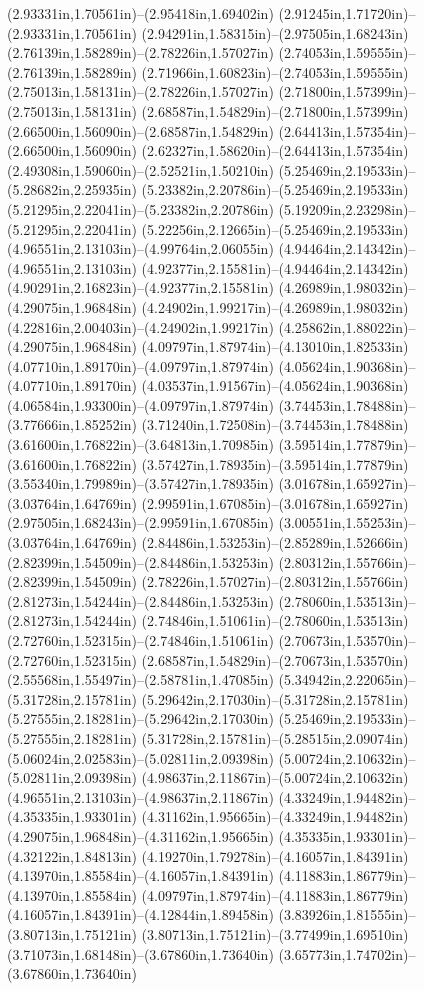 (2.93331in,1.70561in)--(2.95418in,1.69402in) (2.91245in,1.71720in)--(2.93331in,1.70561in) (2.94291in,1.58315in)--(2.97505in,1.68243in) (2.76139in,1.58289in)--(2.78226in,1.57027in) (2.74053in,1.59555in)--(2.76139in,1.58289in) (2.71966in,1.60823in)--(2.74053in,1.59555in) (2.75013in,1.58131in)--(2.78226in,1.57027in) (2.71800in,1.57399in)--(2.75013in,1.58131in) (2.68587in,1.54829in)--(2.71800in,1.57399in) (2.66500in,1.56090in)--(2.68587in,1.54829in) (2.64413in,1.57354in)--(2.66500in,1.56090in) (2.62327in,1.58620in)--(2.64413in,1.57354in) (2.49308in,1.59060in)--(2.52521in,1.50210in) (5.25469in,2.19533in)--(5.28682in,2.25935in) (5.23382in,2.20786in)--(5.25469in,2.19533in) (5.21295in,2.22041in)--(5.23382in,2.20786in) (5.19209in,2.23298in)--(5.21295in,2.22041in) (5.22256in,2.12665in)--(5.25469in,2.19533in) (4.96551in,2.13103in)--(4.99764in,2.06055in) (4.94464in,2.14342in)--(4.96551in,2.13103in) (4.92377in,2.15581in)--(4.94464in,2.14342in) (4.90291in,2.16823in)--(4.92377in,2.15581in) (4.26989in,1.98032in)--(4.29075in,1.96848in) (4.24902in,1.99217in)--(4.26989in,1.98032in) (4.22816in,2.00403in)--(4.24902in,1.99217in) (4.25862in,1.88022in)--(4.29075in,1.96848in) (4.09797in,1.87974in)--(4.13010in,1.82533in) (4.07710in,1.89170in)--(4.09797in,1.87974in) (4.05624in,1.90368in)--(4.07710in,1.89170in) (4.03537in,1.91567in)--(4.05624in,1.90368in) (4.06584in,1.93300in)--(4.09797in,1.87974in) (3.74453in,1.78488in)--(3.77666in,1.85252in) (3.71240in,1.72508in)--(3.74453in,1.78488in) (3.61600in,1.76822in)--(3.64813in,1.70985in) (3.59514in,1.77879in)--(3.61600in,1.76822in) (3.57427in,1.78935in)--(3.59514in,1.77879in) (3.55340in,1.79989in)--(3.57427in,1.78935in) (3.01678in,1.65927in)--(3.03764in,1.64769in) (2.99591in,1.67085in)--(3.01678in,1.65927in) (2.97505in,1.68243in)--(2.99591in,1.67085in) (3.00551in,1.55253in)--(3.03764in,1.64769in) (2.84486in,1.53253in)--(2.85289in,1.52666in) (2.82399in,1.54509in)--(2.84486in,1.53253in) (2.80312in,1.55766in)--(2.82399in,1.54509in) (2.78226in,1.57027in)--(2.80312in,1.55766in) (2.81273in,1.54244in)--(2.84486in,1.53253in) (2.78060in,1.53513in)--(2.81273in,1.54244in) (2.74846in,1.51061in)--(2.78060in,1.53513in) (2.72760in,1.52315in)--(2.74846in,1.51061in) (2.70673in,1.53570in)--(2.72760in,1.52315in) (2.68587in,1.54829in)--(2.70673in,1.53570in) (2.55568in,1.55497in)--(2.58781in,1.47085in) (5.34942in,2.22065in)--(5.31728in,2.15781in) (5.29642in,2.17030in)--(5.31728in,2.15781in) (5.27555in,2.18281in)--(5.29642in,2.17030in) (5.25469in,2.19533in)--(5.27555in,2.18281in) (5.31728in,2.15781in)--(5.28515in,2.09074in) (5.06024in,2.02583in)--(5.02811in,2.09398in) (5.00724in,2.10632in)--(5.02811in,2.09398in) (4.98637in,2.11867in)--(5.00724in,2.10632in) (4.96551in,2.13103in)--(4.98637in,2.11867in) (4.33249in,1.94482in)--(4.35335in,1.93301in) (4.31162in,1.95665in)--(4.33249in,1.94482in) (4.29075in,1.96848in)--(4.31162in,1.95665in) (4.35335in,1.93301in)--(4.32122in,1.84813in) (4.19270in,1.79278in)--(4.16057in,1.84391in) (4.13970in,1.85584in)--(4.16057in,1.84391in) (4.11883in,1.86779in)--(4.13970in,1.85584in) (4.09797in,1.87974in)--(4.11883in,1.86779in) (4.16057in,1.84391in)--(4.12844in,1.89458in) (3.83926in,1.81555in)--(3.80713in,1.75121in) (3.80713in,1.75121in)--(3.77499in,1.69510in) (3.71073in,1.68148in)--(3.67860in,1.73640in) (3.65773in,1.74702in)--(3.67860in,1.73640in) 
